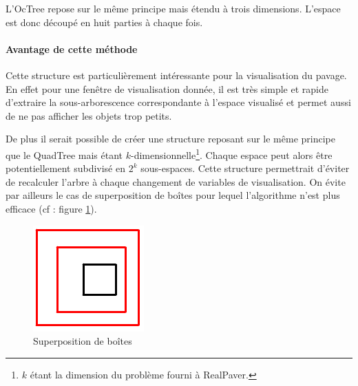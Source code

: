 L'OcTree repose sur le même principe mais étendu à trois dimensions. L'espace est donc découpé en huit parties à chaque fois.

\paragraph{Avantage de cette méthode}Cette structure est particulièrement intéressante pour la visualisation du pavage. En effet pour une fenêtre de visualisation donnée, il est très simple et rapide d'extraire la sous-arborescence correspondante à l'espace visualisé et permet aussi de ne pas afficher les objets trop petits. 

De plus il serait possible de créer une structure reposant sur le même principe que le QuadTree mais étant $k$-dimensionnelle\footnote{$k$ étant la dimension du problème fourni à RealPaver.}. Chaque espace peut alors être potentiellement subdivisé en $2^k$ sous-espaces. Cette structure permettrait d'éviter de recalculer l'arbre à chaque changement de variables de visualisation. On évite par ailleurs le cas de superposition de boîtes pour lequel l'algorithme n'est plus efficace (cf : figure \ref{fig:superpos}).
\begin{figure}[htbp]
\centering
\includegraphics[scale=0.30]{img/QT8}
\caption{Superposition de boîtes}
\label{fig:superpos}
\end{figure}


